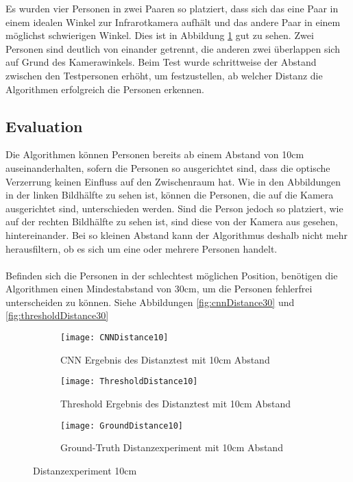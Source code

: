 Es wurden vier Personen in zwei Paaren so platziert, dass sich das eine Paar in einem idealen Winkel zur Infrarotkamera aufhält und das andere Paar in einem möglichst schwierigen Winkel. Dies ist in Abbildung \ref{fig:cnnDistance10} gut zu sehen. Zwei Personen sind deutlich von einander getrennt, die anderen zwei überlappen sich auf Grund des Kamerawinkels. Beim Test wurde schrittweise der Abstand zwischen den Testpersonen erhöht, um festzustellen, ab welcher Distanz die Algorithmen erfolgreich die Personen erkennen.

\subsection{Evaluation}

Die Algorithmen können Personen bereits ab einem Abstand von 10cm auseinanderhalten, sofern die Personen so ausgerichtet sind, dass die optische Verzerrung keinen Einfluss auf den Zwischenraum hat. Wie in den Abbildungen in der linken Bildhälfte zu sehen ist, können die Personen, die auf die Kamera ausgerichtet sind, unterschieden werden. Sind die Person jedoch so platziert, wie auf der rechten Bildhälfte zu sehen ist, sind diese von der Kamera aus gesehen, hintereinander. Bei so kleinen Abstand kann der Algorithmus deshalb nicht mehr herausfiltern, ob es sich um eine oder mehrere Personen handelt.\\
\\
Befinden sich die Personen in der schlechtest möglichen Position, benötigen die Algorithmen einen Mindestabstand von 30cm, um die Personen fehlerfrei unterscheiden zu können. Siehe Abbildungen \ref{fig:cnnDistance30} und \ref{fig:thresholdDistance30}

\begin{figure}[H]
	\begin{subfigure}{.45\linewidth}
		\centering
		\texttt{[image: CNNDistance10]}
		\caption{\gls{CNN} Ergebnis des Distanztest mit 10cm Abstand}
		\label{fig:cnnDistance10}
	\end{subfigure}\hfill%
	\begin{subfigure}{.45\linewidth}
		\centering
		\texttt{[image: ThresholdDistance10]}
		\caption{Threshold Ergebnis des Distanztest mit 10cm Abstand}
		\label{fig:thresholdDistance10}
	\end{subfigure}
	\begin{subfigure}{\linewidth}
		\centering
		\texttt{[image: GroundDistance10]}
		\caption{Ground-Truth Distanzexperiment mit 10cm Abstand}
		\label{fig:groundDistance10}
	\end{subfigure}
	\caption{Distanzexperiment 10cm}
	\label{fig:Distance10}
\end{figure}

